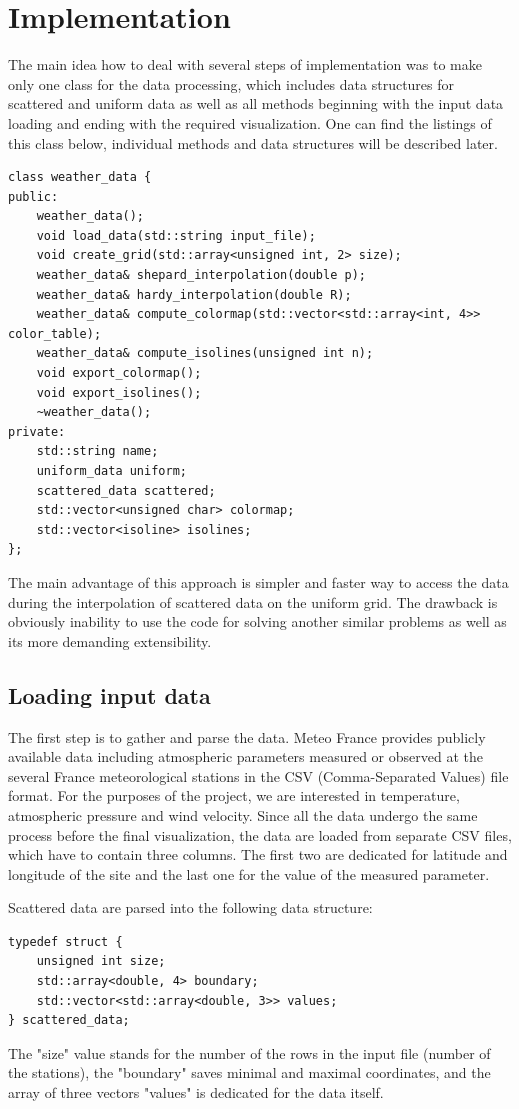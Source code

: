 \documentclass[a4paper, 10pt]{article}
\begin{document}
\section{Implementation}
The main idea how to deal with several steps of implementation was to make only one class for the data processing, which includes data structures for scattered and uniform data as well as all methods beginning with the input data loading and ending with the required visualization. One can find the listings of this class below, individual methods and data structures will be described later.
\begin{lstlisting}[caption=main class for weather data processing]
class weather_data {
public:
	weather_data();
	void load_data(std::string input_file);
	void create_grid(std::array<unsigned int, 2> size);
	weather_data& shepard_interpolation(double p);
	weather_data& hardy_interpolation(double R);
	weather_data& compute_colormap(std::vector<std::array<int, 4>> color_table);
	weather_data& compute_isolines(unsigned int n);
	void export_colormap();
	void export_isolines();
	~weather_data();
private:
	std::string name;
	uniform_data uniform;
	scattered_data scattered;
	std::vector<unsigned char> colormap;
	std::vector<isoline> isolines;
};
\end{lstlisting}

The main advantage of this approach is simpler and faster way to access the data during the interpolation of scattered data on the uniform grid. The drawback is obviously inability to use the code for solving another similar problems as well as its more demanding extensibility. 

\subsection{Loading input data}
The first step is to gather and parse the data. Meteo France provides publicly available data including atmospheric parameters measured or observed at the several France meteorological stations in the CSV (Comma-Separated Values) file format. For the purposes of the project, we are interested in temperature, atmospheric pressure and wind velocity. Since all the data undergo the same process before the final visualization, the data are loaded from separate CSV files, which have to contain three columns. The first two are dedicated for latitude and longitude of the site and the last one for the value of the measured parameter.

Scattered data are parsed into the following data structure: 
\begin{lstlisting}[caption=data structure for scattered data]
typedef struct {
	unsigned int size;
	std::array<double, 4> boundary;
	std::vector<std::array<double, 3>> values;
} scattered_data;
\end{lstlisting}
The "size" value stands for the number of the rows in the input file (number of the stations), the "boundary" saves minimal and maximal coordinates, and the array of three vectors "values" is dedicated for the data itself.
\end{document}
